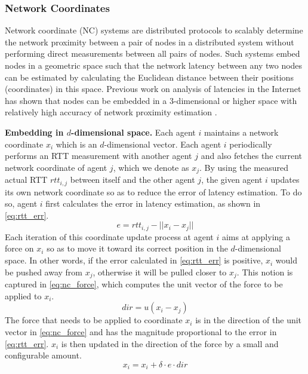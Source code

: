 \subsubsection{Network Coordinates}
Network coordinate (NC) systems are distributed protocols to scalably determine the network proximity between a pair of nodes in a distributed system without performing direct measurements \cite{donnet2010survey} between all pairs of nodes. Such systems embed nodes in a geometric space such that the network latency between any two nodes can be estimated by calculating the Euclidean distance between their positions (coordinates) in this space. Previous work on analysis of latencies in the Internet has shown that nodes can be embedded in a 3-dimensional or higher space with relatively high accuracy of network proximity estimation .
\par \noindent \textbf{Embedding in $d$-dimensional space. } Each agent $i$ maintains a network coordinate $x_i$ which is an $d$-dimensional vector. Each agent $i$ periodically performs an RTT measurement with another agent $j$ and also fetches the current network coordinate of agent $j$, which we denote as $x_j$. By using the measured actual RTT $rtt_{i,j}$ between itself and the other agent $j$, the given agent $i$ updates its own network coordinate so as to reduce the error of latency estimation. To do so, agent $i$ first calculates the error in latency estimation, as shown in \cref{eq:rtt_err}.
\begin{equation}
e = rtt_{i,j} - || x_i - x_j ||
\label{eq:rtt_err}
\end{equation}
Each iteration of this coordinate update process at agent $i$ aims at applying a force on $x_i$ so as to move it toward its correct position in the $d$-dimensional space. In other words, if the error calculated in \cref{eq:rtt_err} is positive, $x_i$ would be pushed away from $x_j$, otherwise it will be pulled closer to $x_j$. This notion is captured in \cref{eq:nc_force}, which computes the unit vector of the force to be applied to $x_i$.
\begin{equation}
dir = u \left( x_i - x_j \right) 
\label{eq:nc_force}
\end{equation}
The force that needs to be applied to coordinate $x_i$ is in the direction of the unit vector in \cref{eq:nc_force} and has the magnitude proportional to the error in \cref{eq:rtt_err}. $x_i$ is then updated in the direction of the force by a small and configurable amount.
\begin{equation}
x_i = x_i + \delta \cdot e \cdot dir 
\label{eq:nc_update}
\end{equation}

